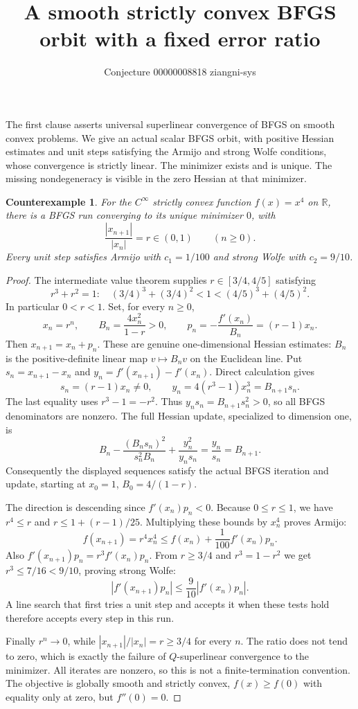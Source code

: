 \documentclass[11pt]{article}
\title{A smooth strictly convex BFGS orbit with a fixed error ratio}
\author{Conjecture 00000008818 \quad ziangni-sys}
\date{}
\newtheorem*{proposition}{Counterexample}
\begin{document}
\maketitle
The first clause asserts universal superlinear convergence of BFGS on smooth convex problems. We give an actual scalar BFGS orbit, with positive Hessian estimates and unit steps satisfying the Armijo and strong Wolfe conditions, whose convergence is strictly linear. The minimizer exists and is unique. The missing nondegeneracy is visible in the zero Hessian at that minimizer.

\begin{proposition}
For the $C^\infty$ strictly convex function $f(x)=x^4$ on $\mathbb R$, there is a BFGS run converging to its unique minimizer $0$, with
\[
 \frac{|x_{n+1}|}{|x_n|}=r\in(0,1)\qquad(n\geq0).
\]
Every unit step satisfies Armijo with $c_1=1/100$ and strong Wolfe with $c_2=9/10$.
\end{proposition}
\begin{proof}
The intermediate value theorem supplies $r\in[3/4,4/5]$ satisfying
\[
 r^3+r^2=1:
 \quad(3/4)^3+(3/4)^2<1<(4/5)^3+(4/5)^2.
\]
In particular $0<r<1$. Set, for every $n\geq0$,
\[
 x_n=r^n,\qquad B_n=\frac{4x_n^2}{1-r}>0,
 \qquad p_n=-\frac{f'(x_n)}{B_n}=(r-1)x_n.
\]
Then $x_{n+1}=x_n+p_n$. These are genuine one-dimensional Hessian estimates: $B_n$ is the positive-definite linear map $v\mapsto B_nv$ on the Euclidean line.
Put $s_n=x_{n+1}-x_n$ and $y_n=f'(x_{n+1})-f'(x_n)$. Direct calculation gives
\[
 s_n=(r-1)x_n\ne0,\qquad
 y_n=4(r^3-1)x_n^3=B_{n+1}s_n.
\]
The last equality uses $r^3-1=-r^2$. Thus $y_ns_n=B_{n+1}s_n^2>0$, so all BFGS denominators are nonzero. The full Hessian update, specialized to dimension one, is
\[
 B_n-\frac{(B_ns_n)^2}{s_n^2B_n}
       +\frac{y_n^2}{y_ns_n}
 =\frac{y_n}{s_n}=B_{n+1}.
\]
Consequently the displayed sequences satisfy the actual BFGS iteration and update, starting at $x_0=1$, $B_0=4/(1-r)$.

The direction is descending since $f'(x_n)p_n<0$. Because $0\leq r\leq1$, we have $r^4\leq r$ and $r\leq1+(r-1)/25$. Multiplying these bounds by $x_n^4$ proves Armijo:
\[
 f(x_{n+1})=r^4x_n^4
 \leq f(x_n)+\frac1{100}f'(x_n)p_n.
\]
Also $f'(x_{n+1})p_n=r^3f'(x_n)p_n$. From $r\geq3/4$ and $r^3=1-r^2$ we get $r^3\leq7/16<9/10$, proving strong Wolfe:
\[
 |f'(x_{n+1})p_n|\leq\frac9{10}|f'(x_n)p_n|.
\]
A line search that first tries a unit step and accepts it when these tests hold therefore accepts every step in this run.

Finally $r^n\to0$, while $|x_{n+1}|/|x_n|=r\geq3/4$ for every $n$. The ratio does not tend to zero, which is exactly the failure of $Q$-superlinear convergence to the minimizer. All iterates are nonzero, so this is not a finite-termination convention. The objective is globally smooth and strictly convex, $f(x)\geq f(0)$ with equality only at zero, but $f''(0)=0$.
\end{proof}
\end{document}
